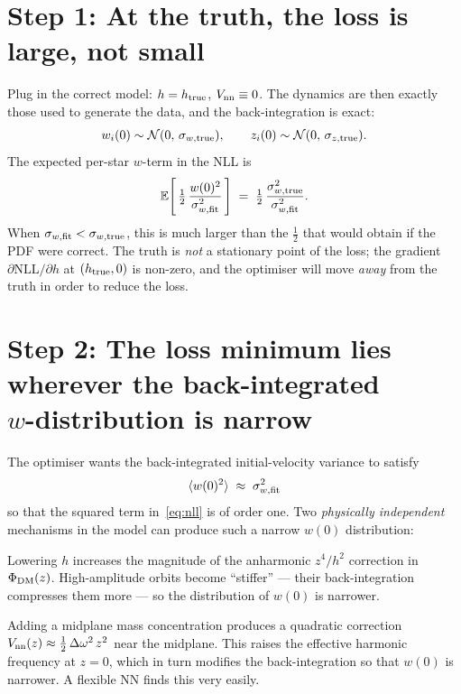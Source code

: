 \documentclass[11pt]{article}
\begin{document}
\section*{Step 1: At the truth, the loss is large, not small}

Plug in the correct model: $h = h_{\rm true}$, $V_{\rm nn} \equiv 0$.  The
dynamics are then exactly those used to generate the data, and the
back-integration is exact:
\begin{equation}
  w_i(0) \sim \mathcal{N}(0,\, \sigma_{w,\rm true}),
  \qquad
  z_i(0) \sim \mathcal{N}(0,\, \sigma_{z,\rm true}).
\end{equation}
The expected per-star $w$-term in the NLL is
\begin{equation}
  \mathbb{E}\!\left[\,\tfrac{1}{2}\,\frac{w(0)^2}{\sigma_{w,\rm fit}^2}\,\right]
  \;=\;
  \tfrac{1}{2}\,\frac{\sigma_{w,\rm true}^2}{\sigma_{w,\rm fit}^2}.
\end{equation}
When $\sigma_{w,\rm fit} < \sigma_{w,\rm true}$, this is much larger than the
$\tfrac{1}{2}$ that would obtain if the PDF were correct.  The truth is
\emph{not} a stationary point of the loss; the gradient
$\partial\mathrm{NLL}/\partial h$ at $(h_{\rm true}, 0)$ is non-zero, and the
optimiser will move \emph{away} from the truth in order to reduce the loss.

\section*{Step 2: The loss minimum lies wherever the back-integrated\\ $w$-distribution is narrow}

The optimiser wants the back-integrated initial-velocity variance to satisfy
\begin{equation}
  \langle w(0)^2 \rangle \;\approx\; \sigma_{w,\rm fit}^2
\end{equation}
so that the squared term in~\eqref{eq:nll} is of order one.  Two
\emph{physically independent} mechanisms in the model can produce such a narrow
$w(0)$ distribution:
\begin{description}[leftmargin=2em, style=nextline]
  \item[(a) Drift in $h$.]
  Lowering $h$ increases the magnitude of the anharmonic $z^4/h^2$ correction
  in $\Phi_{\rm DM}(z)$.  High-amplitude orbits become ``stiffer'' --- their
  back-integration compresses them more --- so the distribution of $w(0)$ is
  narrower.

  \item[(b) A positive-curvature $V_{\rm nn}$.]
  Adding a midplane mass concentration produces a quadratic correction
  $V_{\rm nn}(z) \approx \tfrac{1}{2}\,\Delta\omega^2\, z^2$ near the midplane.
  This raises the effective harmonic frequency at $z = 0$, which in turn
  modifies the back-integration so that $w(0)$ is narrower.  A flexible NN
  finds this very easily.
\end{description}
\end{document}
